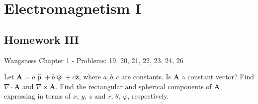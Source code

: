 \documentclass[crop=false,class=article,oneside]{standalone}
\begin{document}
    \ifx\ifphysicscourseselectromagnetismI\undefined
        \section*{Electromagnetism I}
        \setcounter{section}{3}
        \renewcommand\thefigure{%
            \arabic{section}.\arabic{figure}%
        }
        \renewcommand\thesubfigure{%
            \arabic{section}.\arabic{figure}.\arabic{subfigure}%
        }
    \fi    
    \subsection{Homework III}
        Wangsness Chapter 1 - Problems: 19, 20, 21, 22, 23, 24, 26
        \begin{problem}[Wangsness 1-19]
            Let
            $\mathbf{A}%
             =a\hat{\boldsymbol{\uprho}}%
             +b\hat{\boldsymbol{\upvarphi}}%
             +c\hat{\mathbf{z}}$,
            where $a,b,c$ are constants. Is $\mathbf{A}$ a
            constant vector? Find $\nabla\cdot\mathbf{A}$ and
            $\nabla\times\mathbf{A}$. Find the rectangular
            and spherical components of $\mathbf{A}$, expressing
            in terms of $x$, $y$, $z$ and
            $r$, $\theta$, $\varphi$, respectively.
        \end{problem}
\end{document}
